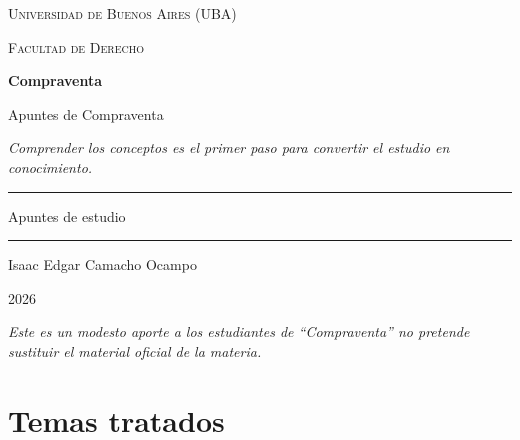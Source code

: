 \documentclass[12pt,oneside]{book}
\newcommand{\universidad}{Universidad de Buenos Aires (UBA)}
\newcommand{\facultad}{Facultad de Derecho}
\newcommand{\materia}{Compraventa}
\newcommand{\titulo}{Apuntes de Compraventa}
\newcommand{\autor}{Isaac Edgar Camacho Ocampo}
\newcommand{\anio}{2026}
\begin{document}
\begin{titlepage}

\thispagestyle{empty}

\begin{center}

\vspace*{1cm}

{\large \textsc{\universidad}}

\vspace{0.2cm}

{\large \textsc{\facultad}}

\vspace{3cm}

{\Huge \textbf{\materia}}

\vspace{1cm}

{\LARGE \titulo}

\vspace{0.8cm}

\textit{Comprender los conceptos es el primer paso para convertir el estudio en conocimiento.}

\vspace{1.2cm}

\rule{0.70\textwidth}{0.5pt}

\vspace{0.5cm}

{\large Apuntes de estudio}

\vspace{0.5cm}

\rule{0.70\textwidth}{0.5pt}

\vfill

{\large \autor}

\vspace{0.3cm}

{\large \anio}

\end{center}

\vfill

\begin{flushleft}
\textit{Este es un modesto aporte a los estudiantes de ``Compraventa'' no pretende sustituir el material oficial de la materia.}
\end{flushleft}

\end{titlepage}

\tableofcontents

\chapter*{Temas tratados}
\end{document}
